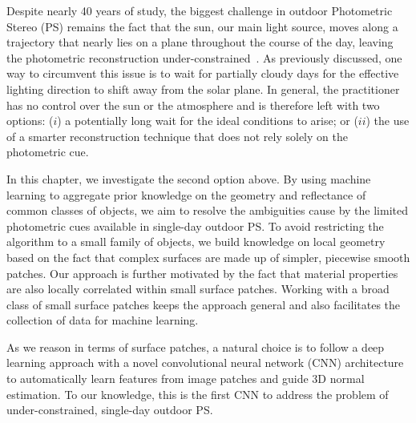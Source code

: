 
Despite nearly 40 years of study, the biggest challenge in outdoor Photometric Stereo (PS) remains the fact that the sun, our main light source, moves along a trajectory that nearly lies on a plane throughout the course of the day, leaving the photometric reconstruction under-constrained~\cite{woodham-opteng-80}.
As previously discussed, one way to circumvent this issue is to wait for partially cloudy days for the effective lighting direction to shift away from the solar plane.
In general, the practitioner has no control over the sun or the atmosphere and is therefore left with two options: ($i$) a potentially long wait for the ideal conditions to arise; or ($ii$) the use of a smarter reconstruction technique that does not rely solely on the photometric cue.

In this chapter, we investigate the second option above. By using machine learning to aggregate prior knowledge on the geometry and reflectance of common classes of objects, we aim to resolve the ambiguities cause by the limited photometric cues available in single-day outdoor PS. To avoid restricting the algorithm to a small family of objects, we build knowledge on local geometry based on the fact that complex surfaces are made up of simpler, piecewise smooth patches. Our approach is further motivated by the fact that material properties are also locally correlated within small surface patches. Working with a broad class of small surface patches keeps the approach general and also facilitates the collection of data for machine learning.


As we reason in terms of surface patches, a natural choice is to follow a deep learning approach with a novel convolutional neural network (CNN) architecture to automatically learn features from image patches and guide 3D normal estimation. To our knowledge, this is the first CNN to address the problem of under-constrained, single-day outdoor PS.

